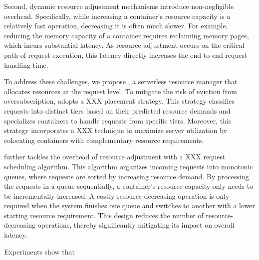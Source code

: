 Second, dynamic resource adjustment mechanisms introduce non-negligible overhead.
Specifically, while increasing a container's resource capacity is a relatively fast operation, decreasing it is often much slower.
For example, reducing the memory capacity of a container requires reclaiming memory pages, which incurs substantial latency.
As resource adjustment occurs on the critical path of request execution, this latency directly increases the end-to-end request handling time.

To address these challenges, we propose \sysname, a serverless resource manager that allocates resources at the request level.
To mitigate the risk of eviction from oversubscription, \sysname adopts a XXX placement strategy.
This strategy classifies requests into distinct tiers based on their predicted resource demands and specializes containers to handle requests from specific tiers.
Moreover, this strategy incorporates a XXX technique to maximize server utilization by colocating containers with complementary resource requirements.


\sysname further tackles the overhead of resource adjustment with a XXX request scheduling algorithm.
This algorithm organizes incoming requests into monotonic queues, where requests are sorted by increasing resource demand.
By processing the requests in a queue sequentially, a container's resource capacity only needs to be incrementally increased.
A costly resource-decreasing operation is only required when the system finishes one queue and switches to another with a lower starting resource requirement.
This design reduces the number of resource-decreasing operations, thereby significantly mitigating its impact on overall latency.

Experiments show that 

